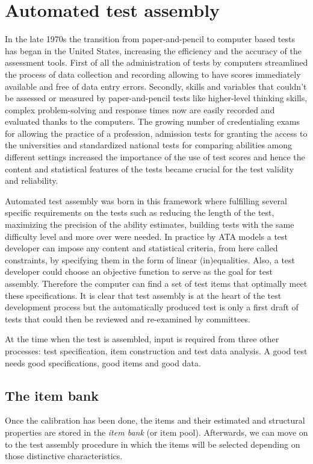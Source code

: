 \chapter{Automated test assembly}\label{sec:ata}

In the late 1970s the transition from paper-and-pencil to computer based tests has began in the United States, increasing the efficiency and the accuracy of the assessment tools. First of all the administration of tests by computers streamlined the process of data collection and recording allowing to have scores immediately available
and free of data entry errors. Secondly, skills and variables that couldn't be
assessed or measured by paper-and-pencil tests like higher-level thinking skills,
complex problem-solving and response times now are easily recorded and evaluated thanks to the computers. The growing number of credentialing exams for allowing the practice of a profession, admission tests for granting the access to the universities and standardized
national tests for comparing abilities among different settings increased
the importance of the use of test scores and hence the content and statistical
features of the tests became crucial for the test validity and reliability.


Automated test assembly was born in this framework where fulfilling several specific requirements on the tests such as reducing the length of the test, maximizing the precision of the ability estimates, building tests with the same difficulty level
and more over were needed. In practice by ATA models a test developer can impose any content and
statistical criteria, from here called constraints, by specifying them in the form
of linear (in)equalities. Also, a test developer could choose an objective function
to serve as the goal for test assembly. Therefore the computer can find a set of
test items that optimally meet these specifications.
It is clear that test assembly is at the heart of the test development
process but the automatically produced test is only a first draft of tests that could
then be reviewed and re-examined by committees.


At the time when the test is assembled, input is required from
three other processes: test specification, item construction and test data
analysis. A good test needs good specifications, good items and good data.


\section{The item bank}\label{sec:the-item-bank}
Once the calibration has been done, the items and their estimated and structural properties are stored in the \emph{item bank} (or item pool). Afterwards, we can move on to the test assembly procedure in which the items will be selected depending on those distinctive characteristics.



